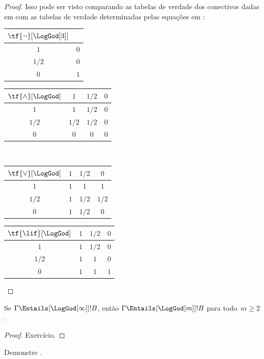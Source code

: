 \documentclass[../../../include/open-logic-section]{subfiles}
\begin{document}
\begin{proof}
  Isso pode ser visto comparando as tabelas de verdade dos conectivos
  dadas em  com as tabelas de verdade
  determinadas pelas equações em :
  \begin{center}
    \begin{tabular}{c|c} 
      $\tf{\lnot}[\LogGod[3]]$ & \\ 
      \hline  
      $1$ & $0$ \\ 
      $1/2$ & $0$ \\
      $0$ & $1$ 
    \end{tabular}
    \quad
    \begin{tabular}{c|ccc} 
      $\tf{\land}[\LogGod]$ & $1$ & $1/2$ & $0$ \\ 
      \hline 
      $1$ & $1$ & $1/2$ & $0$ \\ 
      $1/2$ & $1/2$ & $1/2$ & $0$\\ 
      $0$ & $0$ & $0$ & $0$ 
    \end{tabular}
    \\[2ex]
    \begin{tabular}{c|ccc} 
      $\tf{\lor}[\LogGod]$ & $1$ & $1/2$ & $0$ \\ 
      \hline 
      $1$ & $1$ & $1$ & $1$ \\ 
      $1/2$ & $1$ & $1/2$ & $1/2$ \\
      $0$ & $1$ & $1/2$ & $0$ 
    \end{tabular}
    \quad
    \begin{tabular}{c|ccc} 
      $\tf{\lif}[\LogGod]$ & $1$ & $1/2$ & $0$ \\ 
      \hline 
      $1$ & $1$ & $1/2$ & $0$ \\ 
      $1/2$ & $1$ & $1$ & $0$  \\ 
      $0$ & $1$ & $1$ & $1$ 
    \end{tabular}
  \end{center} 
\end{proof}

\begin{prop}
  Se $\Gamma \Entails[\LogGod[\infty]] !B$, então $\Gamma
  \Entails[\LogGod[m]] !B$ para todo~$m \ge 2$.
\end{prop}

\begin{proof}
  Exercício.
\end{proof}

\begin{prob}
  Demonstre .
\end{prob}
\end{document}
